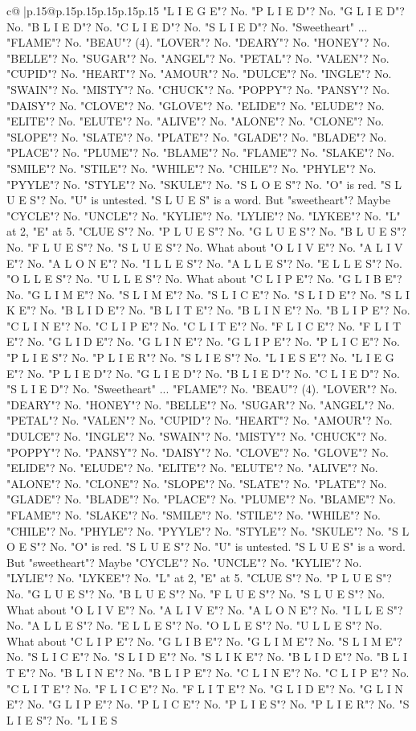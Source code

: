 \documentclass{article}
\begin{document}
{\begin{supertabular}{c@{$\;$}|p{.15\linewidth}@{}p{.15\linewidth}p{.15\linewidth}p{.15\linewidth}p{.15\linewidth}p{.15\linewidth}}
{{{"L I E G E"? No. "P L I E D"? No. "G L I E D"? No. "B L I E D"? No. "C L I E D"? No. "S L I E D"? No. "Sweetheart" ... "FLAME"? No. "BEAU"? (4). "LOVER"? No. "DEARY"? No. "HONEY"? No. "BELLE"? No. "SUGAR"? No. "ANGEL"? No. "PETAL"? No. "VALEN"? No. "CUPID"? No. "HEART"? No. "AMOUR"? No. "DULCE"? No. "INGLE"? No. "SWAIN"? No. "MISTY"? No. "CHUCK"? No. "POPPY"? No. "PANSY"? No. "DAISY"? No. "CLOVE"? No. "GLOVE"? No. "ELIDE"? No. "ELUDE"? No. "ELITE"? No. "ELUTE"? No. "ALIVE"? No. "ALONE"? No. "CLONE"? No. "SLOPE"? No. "SLATE"? No. "PLATE"? No. "GLADE"? No. "BLADE"? No. "PLACE"? No. "PLUME"? No. "BLAME"? No. "FLAME"? No. "SLAKE"? No. "SMILE"? No. "STILE"? No. "WHILE"? No. "CHILE"? No. "PHYLE"? No. "PYYLE"? No. "STYLE"? No. "SKULE"? No. "S L O E S"? No. "O" is red. "S L U E S"? No. "U" is untested. "S L U E S" is a word. But "sweetheart"? Maybe "CYCLE"? No. "UNCLE"? No. "KYLIE"? No. "LYLIE"? No. "LYKEE"? No. "L" at 2, "E" at 5. "CLUE S"? No. "P L U E S"? No. "G L U E S"? No. "B L U E S"? No. "F L U E S"? No. "S L U E S"? No. What about "O L I V E"? No. "A L I V E"? No. "A L O N E"? No. "I L L E S"? No. "A L L E S"? No. "E L L E S"? No. "O L L E S"? No. "U L L E S"? No. What about "C L I P E"? No. "G L I B E"? No. "G L I M E"? No. "S L I M E"? No. "S L I C E"? No. "S L I D E"? No. "S L I K E"? No. "B L I D E"? No. "B L I T E"? No. "B L I N E"? No. "B L I P E"? No. "C L I N E"? No. "C L I P E"? No. "C L I T E"? No. "F L I C E"? No. "F L I T E"? No. "G L I D E"? No. "G L I N E"? No. "G L I P E"? No. "P L I C E"? No. "P L I E S"? No. "P L I E R"? No. "S L I E S"? No. "L I E S E"? No. "L I E G E"? No. "P L I E D"? No. "G L I E D"? No. "B L I E D"? No. "C L I E D"? No. "S L I E D"? No. "Sweetheart" ... "FLAME"? No. "BEAU"? (4). "LOVER"? No. "DEARY"? No. "HONEY"? No. "BELLE"? No. "SUGAR"? No. "ANGEL"? No. "PETAL"? No. "VALEN"? No. "CUPID"? No. "HEART"? No. "AMOUR"? No. "DULCE"? No. "INGLE"? No. "SWAIN"? No. "MISTY"? No. "CHUCK"? No. "POPPY"? No. "PANSY"? No. "DAISY"? No. "CLOVE"? No. "GLOVE"? No. "ELIDE"? No. "ELUDE"? No. "ELITE"? No. "ELUTE"? No. "ALIVE"? No. "ALONE"? No. "CLONE"? No. "SLOPE"? No. "SLATE"? No. "PLATE"? No. "GLADE"? No. "BLADE"? No. "PLACE"? No. "PLUME"? No. "BLAME"? No. "FLAME"? No. "SLAKE"? No. "SMILE"? No. "STILE"? No. "WHILE"? No. "CHILE"? No. "PHYLE"? No. "PYYLE"? No. "STYLE"? No. "SKULE"? No. "S L O E S"? No. "O" is red. "S L U E S"? No. "U" is untested. "S L U E S" is a word. But "sweetheart"? Maybe "CYCLE"? No. "UNCLE"? No. "KYLIE"? No. "LYLIE"? No. "LYKEE"? No. "L" at 2, "E" at 5. "CLUE S"? No. "P L U E S"? No. "G L U E S"? No. "B L U E S"? No. "F L U E S"? No. "S L U E S"? No. What about "O L I V E"? No. "A L I V E"? No. "A L O N E"? No. "I L L E S"? No. "A L L E S"? No. "E L L E S"? No. "O L L E S"? No. "U L L E S"? No. What about "C L I P E"? No. "G L I B E"? No. "G L I M E"? No. "S L I M E"? No. "S L I C E"? No. "S L I D E"? No. "S L I K E"? No. "B L I D E"? No. "B L I T E"? No. "B L I N E"? No. "B L I P E"? No. "C L I N E"? No. "C L I P E"? No. "C L I T E"? No. "F L I C E"? No. "F L I T E"? No. "G L I D E"? No. "G L I N E"? No. "G L I P E"? No. "P L I C E"? No. "P L I E S"? No. "P L I E R"? No. "S L I E S"? No. "L I E S }}}
\end{supertabular}}
\end{document}
